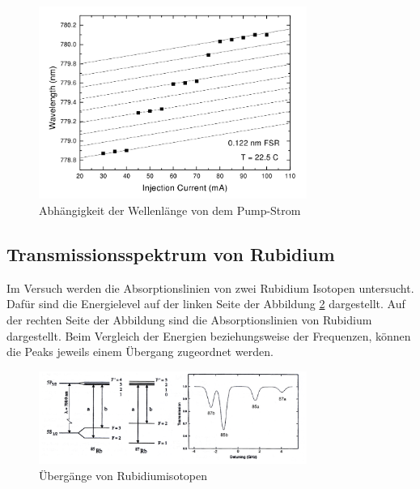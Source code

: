 \begin{figure}
    \centering
    \includegraphics[width = 0.78\textwidth]{pictures/Current.png}
    \caption{Abhängigkeit der Wellenlänge von dem Pump-Strom\cite{theorie}}
    \label{pic:cur}
\end{figure}

\subsection{Transmissionsspektrum von Rubidium}
Im Versuch werden die Absorptionslinien von zwei Rubidium Isotopen untersucht.
Dafür sind die Energielevel auf der linken Seite der Abbildung \ref{pic:energie}
dargestellt. Auf der rechten Seite der Abbildung sind die Absorptionslinien 
von Rubidium dargestellt. Beim Vergleich der Energien beziehungsweise der Frequenzen,
können die Peaks jeweils einem Übergang zugeordnet werden.
\begin{figure}
    \centering
    \includegraphics[width = 0.78\textwidth]{pictures/energielevel.png}
    \caption{Übergänge von Rubidiumisotopen\cite{anleitung}}
    \label{pic:energie}
\end{figure}